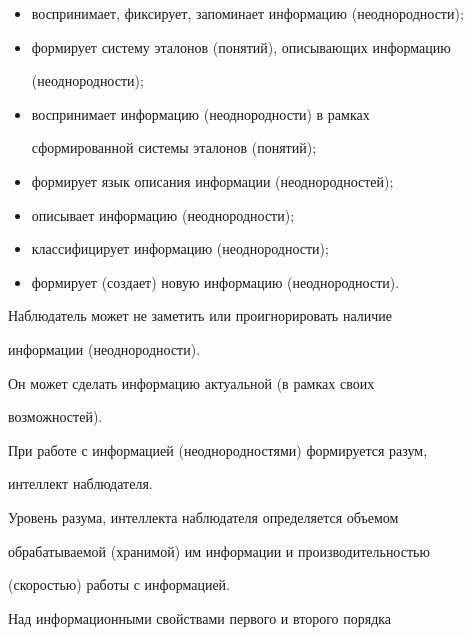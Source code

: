    \begin{itemize}


\item воспринимает, фиксирует, запоминает информацию (неоднородности);


\item формирует систему эталонов (понятий), описывающих информацию 


(неоднородности);


\item воспринимает информацию (неоднородности) в рамках 


сформированной сис\-те\-мы эталонов (понятий);


\item формирует язык описания информации (неоднородностей);


\item описывает информацию (неоднородности);


\item классифицирует информацию (неоднородности);


\item формирует (создает) новую информацию (неоднородности).


\end{itemize}





   Наблюдатель может не заметить или проигнорировать наличие 


информации (неоднородности).


   


   Он может сделать информацию актуальной (в рамках своих 


возможностей).


   


   При работе с информацией (неоднородностями) формируется разум, 


интеллект наблюдателя.


   


   Уровень разума, интеллекта наблюдателя определяется объемом 


обрабатываемой (хранимой) им информации и производительностью 


(скоростью) работы с информацией.


   


   Над информационными свойствами первого и второго порядка 


